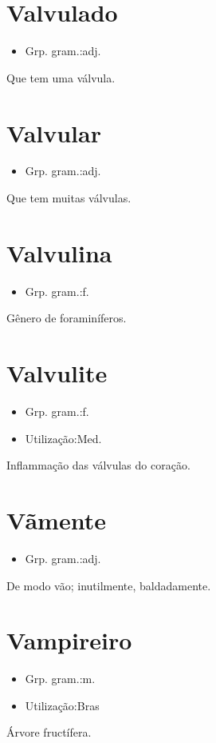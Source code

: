 \documentclass{article}
\begin{document}
\section{Valvulado}
\begin{itemize}
\item {Grp. gram.:adj.}
\end{itemize}
Que tem uma válvula.
\section{Valvular}
\begin{itemize}
\item {Grp. gram.:adj.}
\end{itemize}
Que tem muitas válvulas.
\section{Valvulina}
\begin{itemize}
\item {Grp. gram.:f.}
\end{itemize}
Gênero de foraminíferos.
\section{Valvulite}
\begin{itemize}
\item {Grp. gram.:f.}
\end{itemize}
\begin{itemize}
\item {Utilização:Med.}
\end{itemize}
Inflammação das válvulas do coração.
\section{Vãmente}
\begin{itemize}
\item {Grp. gram.:adj.}
\end{itemize}
De modo vão; inutilmente, baldadamente.
\section{Vampireiro}
\begin{itemize}
\item {Grp. gram.:m.}
\end{itemize}
\begin{itemize}
\item {Utilização:Bras}
\end{itemize}
Árvore fructífera.
\end{document}
